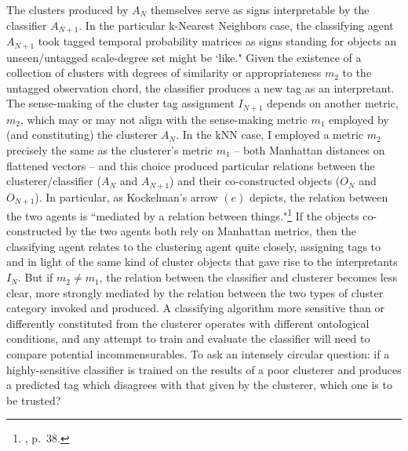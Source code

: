 The clusters produced by $A_N$ themselves serve as signs interpretable by the classifier $A_{N+1}$.  In the particular k-Nearest Neighbors case, the classifying agent $A_{N+1}$ took tagged temporal probability matrices as signs standing for objects an unseen/untagged scale-degree set might be `like."  Given the existence of a collection of clusters with degrees of similarity or appropriateness $m_2$ to the untagged observation chord, the classifier produces a new tag as an interpretant.  The sense-making of the cluster tag assignment $I_{N+1}$ depends on another metric, $m_2$, which may or may not align with the sense-making metric $m_1$ employed by (and constituting) the clusterer $A_{N}$.  In the kNN case, I employed a metric $m_2$ precisely the same as the clusterer's metric $m_1$ -- both Manhattan distances on flattened vectors -- and this choice produced particular relations between the clusterer/classifier ($A_N$ and $A_{N+1}$) and their co-constructed objects ($O_N$ and $O_{N+1}$).  In particular, as Kockelman's arrow $(e)$ depicts, the relation between the two agents is ``mediated by a relation between things."\footnote{\cite{kockelman2013}, p.\ 38.}  If the objects co-constructed by the two agents both rely on Manhattan metrics, then the classifying agent relates to the clustering agent quite closely, assigning tags to and in light of the same kind of cluster objects that gave rise to the interpretants $I_N$.  But if $m_2 \neq m_1$, the relation between the classifier and clusterer becomes less clear, more strongly mediated by the relation between the two types of cluster category invoked and produced.  A classifying algorithm more sensitive than or differently constituted from the clusterer operates with different ontological conditions, and any attempt to train and evaluate the classifier will need to compare potential incommensurables.  To ask an intensely circular question: if a highly-sensitive classifier is trained on the results of a poor clusterer and produces a predicted tag which disagrees with that given by the clusterer, which one is to be trusted?

